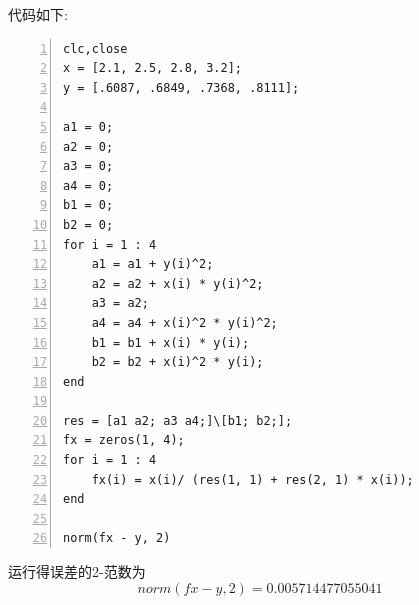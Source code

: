 \documentclass[12pt,a4paper,UTF8]{ctexart}
\begin{document}
\begin{enumerate}
	代码如下:\\
\begin{lstlisting}[frame=single,numbers=left]clc,close
x = [2.1, 2.5, 2.8, 3.2];
y = [.6087, .6849, .7368, .8111];

a1 = 0;
a2 = 0;
a3 = 0;
a4 = 0;
b1 = 0;
b2 = 0;
for i = 1 : 4
    a1 = a1 + y(i)^2;
    a2 = a2 + x(i) * y(i)^2;
    a3 = a2;
    a4 = a4 + x(i)^2 * y(i)^2;
    b1 = b1 + x(i) * y(i);
    b2 = b2 + x(i)^2 * y(i);
end

res = [a1 a2; a3 a4;]\[b1; b2;];
fx = zeros(1, 4);
for i = 1 : 4
    fx(i) = x(i)/ (res(1, 1) + res(2, 1) * x(i));
end

norm(fx - y, 2)
\end{lstlisting}

	运行得误差的2-范数为$$norm(fx-y,2)=0.005714477055041$$
\end{enumerate}
\end{document}
